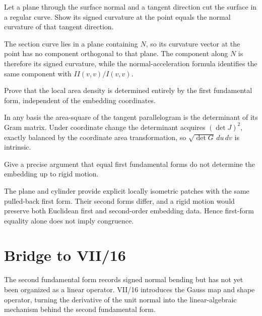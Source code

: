 \begin{problem}\label{prob:vii15-ch03}
Let a plane through the surface normal and a tangent direction cut the surface in a regular curve. Show its signed curvature at the point equals the normal curvature of that tangent direction.
\end{problem}
\begin{solution}
The section curve lies in a plane containing \(N\), so its curvature vector at the point has no component orthogonal to that plane. The component along \(N\) is therefore its signed curvature, while the normal-acceleration formula identifies the same component with \(II(v,v)/I(v,v)\).
\end{solution}

\begin{problem}\label{prob:vii15-ch04}
Prove that the local area density is determined entirely by the first fundamental form, independent of the embedding coordinates.
\end{problem}
\begin{solution}
In any basis the area-square of the tangent parallelogram is the determinant of its Gram matrix. Under coordinate change the determinant acquires \((\det J)^2\), exactly balanced by the coordinate area transformation, so \(\sqrt{\det G}\,du\,dv\) is intrinsic.
\end{solution}

\begin{problem}\label{prob:vii15-ch05}
Give a precise argument that equal first fundamental forms do not determine the embedding up to rigid motion.
\end{problem}
\begin{solution}
The plane and cylinder provide explicit locally isometric patches with the same pulled-back first form. Their second forms differ, and a rigid motion would preserve both Euclidean first and second-order embedding data. Hence first-form equality alone does not imply congruence.
\end{solution}

\section*{Bridge to VII/16}
The second fundamental form records signed normal bending but has not yet been organized as a linear operator.  VII/16 introduces the Gauss map and shape operator, turning the derivative of the unit normal into the linear-algebraic mechanism behind the second fundamental form.
